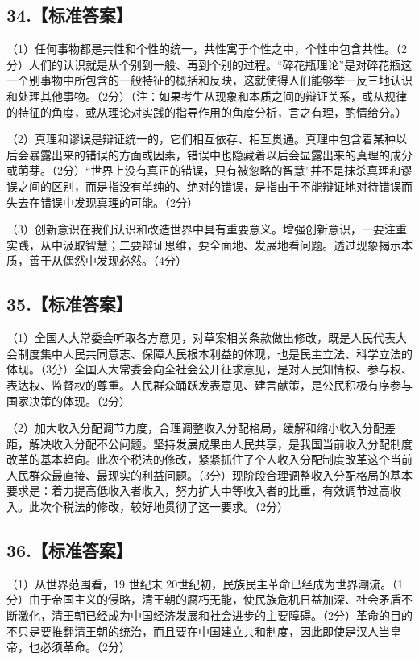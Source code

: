 \documentclass[UTF8,11pt]{ctexart}
\begin{document}
\subsection*{34.【标准答案】}

（1）任何事物都是共性和个性的统一，共性寓于个性之中，个性中包含共性。（2分）人们的认识就是从个别到一般、再到个别的过程。“碎花瓶理论”是对碎花瓶这一个别事物中所包含的一般特征的概括和反映，这就使得人们能够举一反三地认识和处理其他事物。（2分）（注：如果考生从现象和本质之间的辩证关系，或从规律的特征的角度，或从理论对实践的指导作用的角度分析，言之有理，酌情给分。）


（2）真理和谬误是辩证统一的，它们相互依存、相互贯通。真理中包含着某种以后会暴露出来的错误的方面或因素，错误中也隐藏着以后会显露出来的真理的成分或萌芽。（2分）“世界上没有真正的错误，只有被忽略的智慧”并不是抹杀真理和谬误之间的区别，而是指没有单纯的、绝对的错误，是指由于不能辩证地对待错误而失去在错误中发现真理的可能。（2分）


（3）创新意识在我们认识和改造世界中具有重要意义。增强创新意识，一要注重实践，从中汲取智慧；二要辩证思维，要全面地、发展地看问题。透过现象揭示本质，善于从偶然中发现必然。（4分）


\subsection*{35.【标准答案】}

（1）全国人大常委会听取各方意见，对草案相关条款做出修改，既是人民代表大会制度集中人民共同意志、保障人民根本利益的体现，也是民主立法、科学立法的体现。（3分）全国人大常委会向全社会公开征求意见，是对人民知情权、参与权、表达权、监督权的尊重。人民群众踊跃发表意见、建言献策，是公民积极有序参与国家决策的体现。（2分）


（2）加大收入分配调节力度，合理调整收入分配格局，缓解和缩小收入分配差距，解决收入分配不公问题。坚持发展成果由人民共享，是我国当前收入分配制度改革的基本趋向。此次个税法的修改，紧紧抓住了个人收入分配制度改革这个当前人民群众最直接、最现实的利益问题。（3分）现阶段合理调整收入分配格局的基本要求是：着力提高低收入者收入，努力扩大中等收入者的比重，有效调节过高收入。此次个税法的修改，较好地贯彻了这一要求。（2分）


\subsection*{36.【标准答案】}

（1）从世界范围看，19 世纪末 20世纪初，民族民主革命已经成为世界潮流。（1分）由于帝国主义的侵略，清王朝的腐朽无能，使民族危机日益加深、社会矛盾不断激化，清王朝已经成为中国经济发展和社会进步的主要障碍。（2分）革命的目的不只是要推翻清王朝的统治，而且要在中国建立共和制度，因此即使是汉人当皇帝，也必须革命。（2分）
\end{document}
